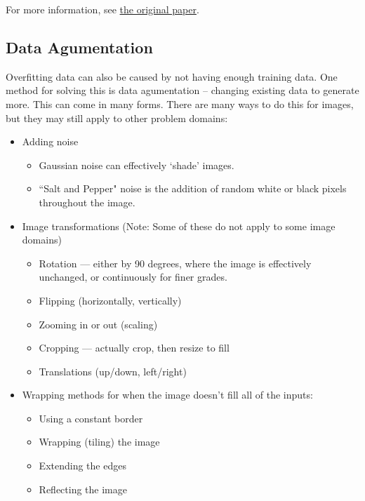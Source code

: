 \documentclass[fleqn]{article}
\begin{document}
For more information, see
\href{http://jmlr.org/papers/volume15/srivastava14a.old/srivastava14a.pdf}
{the original paper}.

\subsection{Data Agumentation}
Overfitting data can also be caused by not having enough training data.
One method for solving this is data agumentation -- changing existing data
to generate more. This can come in many forms. There are many ways to do
this for images, but they may still apply to other problem domains:
\begin{itemize}
	\item Adding noise
	\begin{itemize}
		\item Gaussian noise can effectively `shade' images.
		\item ``Salt and Pepper" noise is the addition of random white or
		black pixels throughout the image.
	\end{itemize}

	\item Image transformations (Note: Some of these do not apply to some
	image domains)
	\begin{itemize}
		\item Rotation --- either by 90 degrees, where the image is
		effectively unchanged, or continuously for finer grades.
		\item Flipping (horizontally, vertically)
		\item Zooming in or out (scaling)
		\item Cropping --- actually crop, then resize to fill
		\item Translations (up/down, left/right)
	\end{itemize}

	\item Wrapping methods for when the image doesn't fill all of the
	inputs:
	\begin{itemize}
		\item Using a constant border
		\item Wrapping (tiling) the image
		\item Extending the edges
		\item Reflecting the image
	\end{itemize}
\end{itemize}
\end{document}
